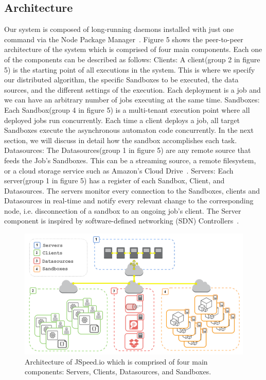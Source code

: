 \documentclass[10pt,reprint]{socc14}
\begin{document}
\subsection{Architecture}
Our system is composed of long-running daemons installed with just one command via the Node Package Manager~\cite{NPM}. Figure 5 shows the peer-to-peer architecture of the system which is comprised of four main components. Each one of the components can be described as follows:
Clients: A client(group 2 in figure 5)  is the starting point of all executions in the system. This is where we specify our distributed algorithm, the specific Sandboxes to be executed, the data sources, and the different settings of the execution. Each deployment is a job and we can have an arbitrary number of jobs executing at the same time.
Sandboxes: Each Sandbox(group 4 in figure 5) is a multi-tenant execution point where all deployed jobs run concurrently. Each time a client deploys a job, all target Sandboxes execute the asynchronous automaton code concurrently. In the next section, we will discuss in detail how the sandbox accomplishes each task.
Datasources: The Datasources(group 1 in figure 5) are any remote source that feeds the Job’s Sandboxes. This can be a streaming source, a remote filesystem, or a cloud storage service such as Amazon’s Cloud Drive~\cite{Amazon}.
Servers: Each server(group 1 in figure 5)  has a register of each Sandbox, Client, and Datasources. The servers monitor every connection to the Sandboxes, clients and Datasources in real-time and notify every relevant change to the corresponding node, i.e. disconnection of a sandbox to an ongoing job’s client. The Server component is inspired by software-defined networking (SDN) Controllers~\cite{Mckeown2008}.



\begin{figure}
	\centering
	\includegraphics[scale=0.6]{architectureDiagram}
	\caption{Architecture of JSpeed.io which is comprised of four main components: Servers, Clients, Datasources, and Sandboxes.}
\end{figure}
\end{document}
